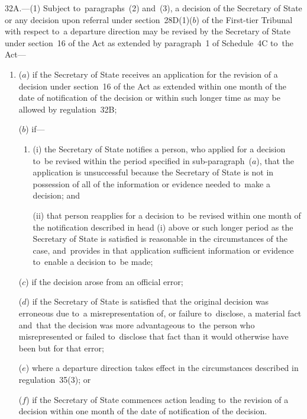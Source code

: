\documentclass[12pt,a4paper]{article}
\begin{document}
32A.—(1) Subject to~paragraphs~(2) and~(3), a decision of the Secretary of State or any decision upon referral under section~28D(1)($b$) of 
the First-tier Tribunal  %
with respect to~a departure direction may be revised by the Secretary of State under section~16 of the Act as extended by paragraph~1 of Schedule~4C to~the Act---
\begin{enumerate}\item[]
($a$) if the Secretary of State receives an application for the revision of a decision under section~16 of the Act as extended within one month of the date of notification of the decision or within such longer time as may be allowed by regulation~32B;

($b$) if---
\begin{enumerate}\item[]
(i) the Secretary of State notifies a person, who applied for a decision to~be revised within the period specified in sub-paragraph~($a$), that the application is unsuccessful because the Secretary of State is not in possession of all of the information or evidence 
needed to~make a decision; and

(ii) that person reapplies for a decision to~be revised within one month of the notification described in head (i) above or such longer period as the Secretary of State is satisfied is reasonable in the circumstances of the case, and~provides in that application sufficient information or evidence to~enable a decision to~be made;
\end{enumerate}

($c$) if the decision arose from an official error;

($d$) if the Secretary of State is satisfied that the original decision was erroneous due to~a misrepresentation of, or failure to~disclose, a material fact and~that the decision was more advantageous to~the person who misrepresented or failed to~disclose that fact than it would otherwise have been but for that error;

($e$) where a departure direction takes effect in the circumstances described in regulation~35(3); or

($f$) if the Secretary of State commences action leading to~the revision of a decision within one month of the date of notification of the decision.
\end{enumerate}
\end{document}

